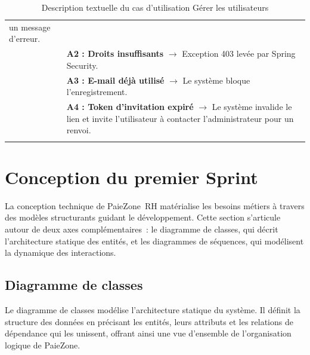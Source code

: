 \begin{xltabular}{\textwidth}{|l|X|}
      un message d'erreur. \\ 
    & \textbf{A2 : Droits insuffisants} $\rightarrow$ Exception 403 levée 
      par Spring Security. \\ 
    & \textbf{A3 : E-mail déjà utilisé} $\rightarrow$ Le système bloque 
      l'enregistrement. \\ 
    & \textbf{A4 : Token d'invitation expiré} $\rightarrow$ Le système invalide 
      le lien et invite l'utilisateur à contacter l'administrateur pour 
      un renvoi.
    \\ \hline
    \caption{Description textuelle du cas d'utilisation Gérer les utilisateurs}
    \label{tab:uc_gestion_utilisateurs} 
\end{xltabular}
\section{Conception du premier Sprint}
\label{sec:s1-conception}
La conception technique de PaieZone~RH matérialise les besoins métiers à travers des 
modèles structurants guidant le développement. Cette section s'articule autour de deux 
axes complémentaires~: le diagramme de classes, qui décrit l'architecture statique des 
entités, et les diagrammes de séquences, qui modélisent la dynamique des interactions.

\subsection{Diagramme de classes}
Le diagramme de classes modélise l'architecture statique du système. Il définit la 
structure des données en précisant les entités, leurs attributs et les relations de 
dépendance qui les unissent, offrant ainsi une vue d'ensemble de l'organisation logique 
de PaieZone.


